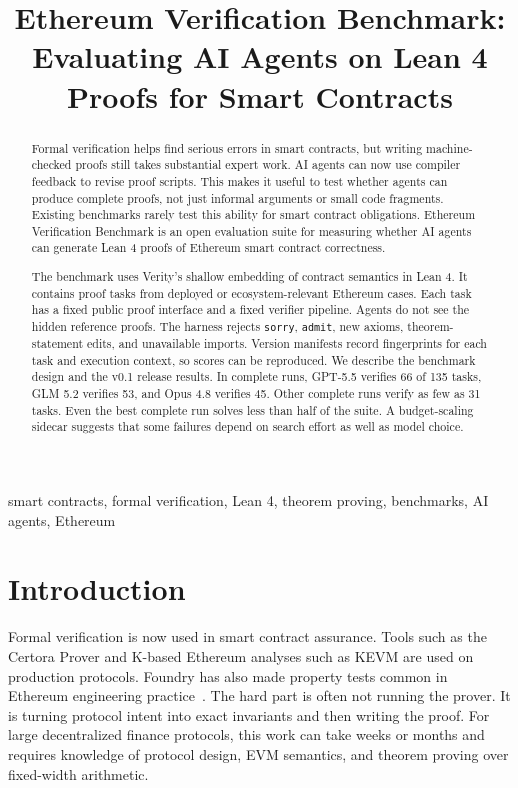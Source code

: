 \documentclass[conference]{IEEEtran}
\title{Ethereum Verification Benchmark: Evaluating AI Agents on Lean 4 Proofs for Smart Contracts}
\author{\IEEEauthorblockN{Anonymous Authors}}
\author{\IEEEauthorblockN{Thomas Marchand}
\IEEEauthorblockA{Independent Researcher\\
Lisbon, Portugal\\
research@thomas.md}}
\newcommand{\toolname}{Ethereum Verification Benchmark}
\newcommand{\lean}{Lean 4}
\begin{document}
\maketitle

\begin{abstract}
Formal verification helps find serious errors in smart contracts, but writing
machine-checked proofs still takes substantial expert work. AI agents can now
use compiler feedback to revise proof scripts. This makes it useful to test
whether agents can produce complete proofs, not just informal arguments or small
code fragments. Existing benchmarks rarely test this ability for smart contract
obligations. \toolname{} is an open evaluation suite for measuring whether AI
agents can generate \lean{} proofs of Ethereum smart contract correctness.

The benchmark uses Verity's shallow embedding of contract semantics in \lean{}.
It contains \BenchmarkTaskCount{} proof tasks from \BenchmarkCaseCount{}
deployed or ecosystem-relevant Ethereum cases. Each task has a fixed public
proof interface and a fixed verifier pipeline. Agents do not see the hidden
reference proofs. The harness rejects \texttt{sorry}, \texttt{admit}, new
axioms, theorem-statement edits, and unavailable imports. Version manifests
record fingerprints for each task and execution context, so scores can be
reproduced. We describe the benchmark design and the v0.1 release results. In
complete runs, GPT-5.5 verifies 66 of 135 tasks, GLM 5.2 verifies 53, and Opus
4.8 verifies 45. Other complete runs verify as few as 31 tasks. Even the best
complete run solves less than half of the suite. A budget-scaling sidecar
suggests that some failures depend on search effort as well as model choice.
\end{abstract}

\begin{IEEEkeywords}
smart contracts, formal verification, Lean 4, theorem proving, benchmarks,
AI agents, Ethereum
\end{IEEEkeywords}

\section{Introduction}

Formal verification is now used in smart contract assurance. Tools such as the
Certora Prover and K-based Ethereum analyses such as KEVM are used on production
protocols. Foundry has also made property tests common in Ethereum engineering
practice~\cite{certora,kevm,kframework,foundry}. The hard part is often not
running the prover. It is turning protocol intent into exact invariants and then
writing the proof. For large decentralized finance protocols, this work can
take weeks or months and requires knowledge of protocol design, EVM semantics,
and theorem proving over fixed-width arithmetic.
\end{document}
